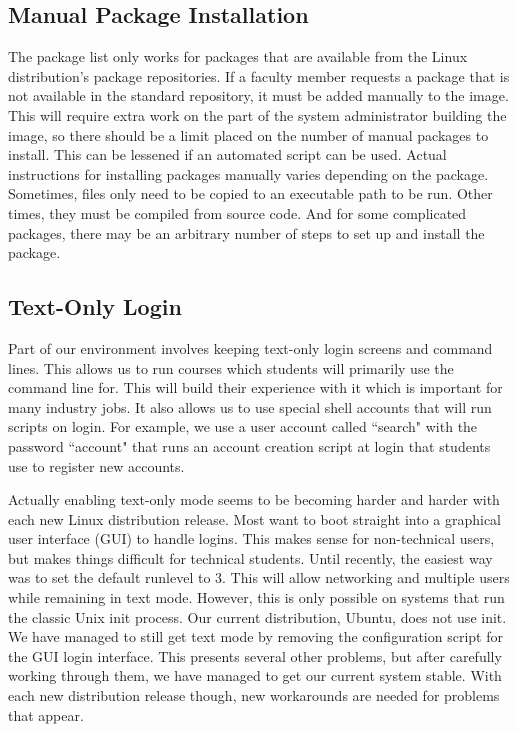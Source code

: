 \subsection{Manual Package Installation}
The package list only works for packages that are available from the Linux distribution's package repositories.  If a faculty member requests a package that is not available in the standard repository, it must be added manually to the image.  This will require extra work on the part of the system administrator building the image, so there should be a limit placed on the number of manual packages to install.  This can be lessened if an automated script can be used.  Actual instructions for installing packages manually varies depending on the package.  Sometimes, files only need to be copied to an executable path to be run.  Other times, they must be compiled from source code.  And for some complicated packages, there may be an arbitrary number of steps to set up and install the package.  

\subsection{Text-Only Login}
Part of our environment involves keeping text-only login screens and command lines.  This allows us to run courses which students will primarily use the command line for.  This will build their experience with it which is important for many industry jobs.  It also allows us to use special shell accounts that will run scripts on login.  For example, we use a user account called ``search" with the password ``account" that runs an account creation script at login that students use to register new accounts.  

Actually enabling text-only mode seems to be becoming harder and harder with each new Linux distribution release.  Most want to boot straight into a graphical user interface (GUI) to handle logins.  This makes sense for non-technical users, but makes things difficult for technical students.  Until recently, the easiest way was to set the default runlevel to 3.  This will allow networking and multiple users while remaining in text mode.  However, this is only possible on systems that run the classic Unix init process.  Our current distribution, Ubuntu, does not use init.  We have managed to still get text mode by removing the configuration script for the GUI login interface.  This presents several other problems, but after carefully working through them, we have managed to get our current system stable.  With each new distribution release though, new workarounds are needed for problems that appear.  

